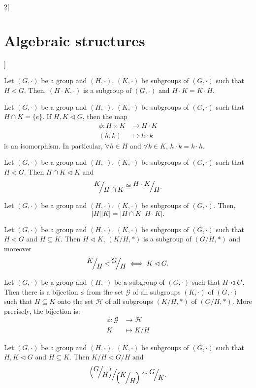 \documentclass[../../../main.tex]{subfiles}
\begin{document}
\begin{multicols}{2}[\section{Algebraic structures}]
\begin{prop}
    Let $(G,\cdot)$ be a group and $(H,\cdot)$, $(K,\cdot)$ be subgroups of $(G,\cdot)$ such that $H\lhd G$. Then, $(H\cdot K,\cdot)$ is a subgroup of $(G,\cdot)$ and $H\cdot K=K\cdot H$.
\end{prop}
\begin{prop}
    Let $(G,\cdot)$ be a group and $(H,\cdot)$, $(K,\cdot)$ be subgroups of $(G,\cdot)$ such that $H\cap K=\{e\}$. If $H,K\lhd G$, then the map 
    \begin{align*}
        \phi:H\times K&\longrightarrow H\cdot K\\
        (h,k)&\longmapsto h\cdot k
    \end{align*}
    is an isomorphism. In particular, $\forall h\in H$ and $\forall k\in K$, $h\cdot k=k\cdot h$.
\end{prop}
\begin{theorem}
    Let $(G,\cdot)$ be a group and $(H,\cdot)$, $(K,\cdot)$ be subgroups of $(G,\cdot)$ such that $H\lhd G$. Then $H\cap K\lhd K$ and $$\quot{K}{H\cap K}\cong\quot{H\cdot K}{H}.$$
\end{theorem}
\begin{corollary}
    Let $(G,\cdot)$ be a group and $(H,\cdot)$, $(K,\cdot)$ be subgroups of $(G,\cdot)$. Then, $$|H||K|=|H\cap K||H\cdot K|.$$
\end{corollary}
\begin{lemma}
    Let $(G,\cdot)$ be a group and $(H,\cdot)$, $(K,\cdot)$ be subgroups of $(G,\cdot)$ such that $H\lhd G$ and $H\subseteq K$. Then $H\lhd K$, $(K/H,*)$ is a subgroup of $(G/H,*)$ and moreover $$\quot{K}{H}\lhd\quot{G}{H}\iff K\lhd G.$$
\end{lemma}
\begin{theorem}
    Let $(G,\cdot)$ be a group and $(H,\cdot)$ be a subgroup of $(G,\cdot)$ such that $H\lhd G$. Then there is a bijection $\phi$ from the set $\mathcal{G}$ of all subgroups $(K,\cdot)$ of $(G,\cdot)$ such that $H\subseteq K$ onto the set $\mathcal{H}$ of all subgroups $\left(K/H,*\right)$ of $\left(G/H,*\right)$. More precisely, the bijection is:
    \begin{align*}
        \phi:\mathcal{G}&\longrightarrow\mathcal{H}\\
        K&\longmapsto K/H
    \end{align*}
\end{theorem}
\begin{theorem}
    Let $(G,\cdot)$ be a group and $(H,\cdot)$, $(K,\cdot)$ be subgroups of $(G,\cdot)$ such that $H,K\lhd G$ and $H\subseteq K$. Then $K/H\lhd G/H$ and $$\quot{\left(\quot{G}{H}\right)}{\left(\quot{K}{H}\right)}\cong\quot{G}{K}.$$
\end{theorem}

\end{multicols}
\end{document}

